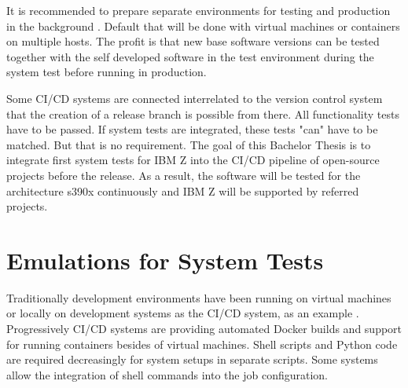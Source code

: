 It is recommended to prepare separate environments for testing and production in the background \cite[~p.120]{Scholl2019}. 
Default that will be done with virtual machines or containers on multiple hosts. The profit is that new base software versions can be tested together with the self developed software in the test environment during the system test before running in production.

Some CI/CD systems are connected interrelated to the version control system that the creation of a release branch is possible from there. All functionality tests have to be passed.  If system tests are integrated, these tests "can" have to be matched. But that is no requirement. The goal of this Bachelor Thesis is to integrate first system tests for IBM Z into the CI/CD pipeline of open-source projects before the release. As a result, the software will be tested for the architecture s390x continuously and IBM Z will be supported by referred projects.

\section{Emulations for System Tests}

Traditionally development environments have been running on virtual machines or locally on development systems as the CI/CD system, as an example \cite[~p.123]{Scholl2019}. Progressively CI/CD systems are providing automated Docker builds and support for running containers besides of virtual machines. 
Shell scripts and Python code are required decreasingly for system setups in separate scripts. Some systems allow the integration of shell commands into the job configuration.